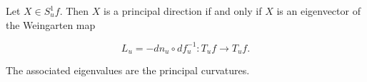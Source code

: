 Let $X \in S_u^1 f$. Then $X$ is a principal direction if and only if $X$ is an eigenvector of the Weingarten map

$$L_u = -dn_u \circ df_u^{-1}: T_u f \rightarrow T_u f.$$

The associated eigenvalues are the principal curvatures.
